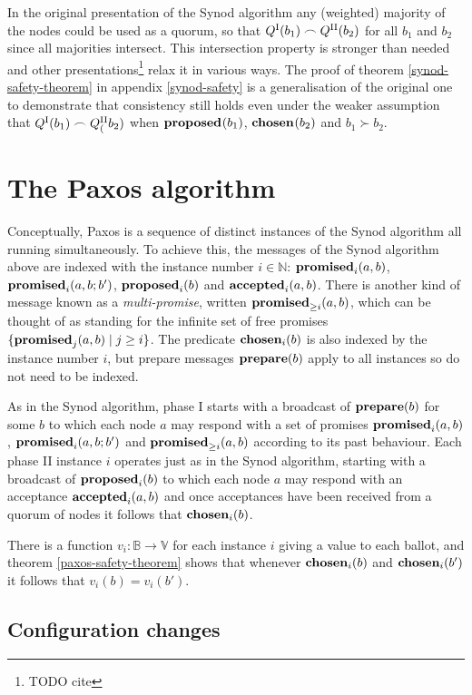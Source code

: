\documentclass[journal]{IEEEtran}
\begin{document}
In the original presentation of the Synod algorithm any (weighted) majority of
the nodes could be used as a quorum, so that ${Q}^\textrm{I}_{}(b_1) \frown {Q}^\textrm{II}_{}(b_2)$
for all $b_1$ and $b_2$ since all majorities intersect.  This intersection
property is stronger than needed and other presentations\footnote{TODO cite}
relax it in various ways. The proof of theorem \ref{synod-safety-theorem} in
appendix \ref{synod-safety} is a generalisation of the original one to
demonstrate that consistency still holds even under the weaker assumption that
${Q}^\textrm{I}_{}(b_1) \frown {Q}^\textrm{II}_{(}b_2)$ when $\mathbf{proposed}_{}(b_1)$, $\mathbf{chosen}_{}(b_2)$ and $b_1
\succ b_2$.

\section{The Paxos algorithm}

Conceptually, Paxos is a sequence of distinct instances of the Synod algorithm
all running simultaneously. To achieve this, the messages of the Synod
algorithm above are indexed with the instance number $i \in \mathbb N$:
$\mathbf{promised}_{i}(a,b)$, $\mathbf{promised}_{i}(a,b;b')$, $\mathbf{proposed}_{i}(b)$ and $\mathbf{accepted}_{i}(a,b)$.
There is another kind of message known as a \textit{multi-promise}, written
$\mathbf{promised}_{\ge i}(a,b)$, which can be thought of as standing for the infinite set of
free promises ${\{ \mathbf{promised}_{j}(a,b) \mid j \ge i \}}$. The predicate
$\mathbf{chosen}_{i}(b)$ is also indexed by the instance number $i$, but prepare
messages $\mathbf{prepare}(b)$ apply to all instances so do not need to be indexed.

As in the Synod algorithm, phase I starts with a broadcast of $\mathbf{prepare}(b)$ for
some $b$ to which each node $a$ may respond with a set of promises
$\mathbf{promised}_{i}(a,b)$, $\mathbf{promised}_{i}(a,b;b')$ and $\mathbf{promised}_{\ge i}(a,b)$ according to its
past behaviour. Each phase II instance $i$ operates just as in the Synod
algorithm, starting with a broadcast of $\mathbf{proposed}_{i}(b)$ to which each node $a$
may respond with an acceptance $\mathbf{accepted}_{i}(a,b)$ and once acceptances have been
received from a quorum of nodes it follows that $\mathbf{chosen}_{i}(b)$.

There is a function $v_i : \mathbb B \to \mathbb V$ for each instance $i$
giving a value to each ballot, and theorem \ref{paxos-safety-theorem} shows
that whenever $\mathbf{chosen}_{i}(b)$ and $\mathbf{chosen}_{i}(b')$ it follows that $v_i(b) =
v_i(b')$.

\subsection{Configuration changes}\label{configuration-changes}
\end{document}
